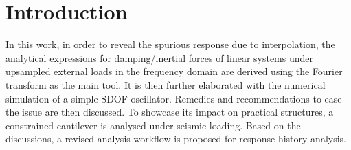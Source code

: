 \section{Introduction}
In this work, in order to reveal the spurious response due to interpolation, the analytical expressions for damping/inertial forces of linear systems under upsampled external loads in the frequency domain are derived using the Fourier transform as the main tool. It is then further elaborated with the numerical simulation of a simple SDOF oscillator. Remedies and recommendations to ease the issue are then discussed. To showcase its impact on practical structures, a constrained cantilever is analysed under seismic loading. Based on the discussions, a revised analysis workflow is proposed for response history analysis.